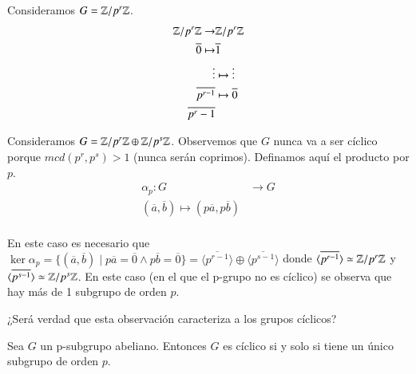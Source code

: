 \begin{ej}
	Consideramos $G = \mathbb{Z}/p^r\mathbb{Z}$.
	\begin{align*}
		\mathbb{Z}/p^r\mathbb{Z} \to &\mathbb{Z}/p^r\mathbb{Z} \\
		\overline{0} \mapsto & \overline{1} \\
		\vdots & \mapsto \vdots \\
		\overline{p^{r-1}} & \mapsto \overline{0} \\
		\overline{p^r-1} &
	\end{align*}
\end{ej}

\begin{ej}
	Consideramos $G = \mathbb{Z}/p^r\mathbb{Z} \oplus \mathbb{Z}/p^s\mathbb{Z}$. Observemos que $G$ nunca va a ser cíclico porque $mcd(p^r, p^s) > 1$ (nunca serán coprimos). Definamos aquí el producto por $p$.
	\begin{align*}
		\alpha_p : G &\to G \\
		(\overline{a}, \overline{b}) \mapsto (p\overline{a}, p \overline{b}) \\
	\end{align*}
	
	En este caso es necesario que $\ker \alpha_p = \{(\overline{a}, \overline{b}) \mid p\overline{a} = \overline{0} \land p \overline{b} = \overline{0}\} = \langle \overline{p^{r-1}}\rangle \oplus \langle \overline{p^{s-1}} \rangle$ donde $\langle \overline{p^{r-1}}\rangle \simeq \mathbb{Z}/p^r\mathbb{Z}$ y $\langle \overline{p^{s-1}}\rangle \simeq \mathbb{Z}/p^s\mathbb{Z}$. En este caso (en el que el p-grupo no es cíclico) se observa que hay más de 1 subgrupo de orden $p$.
\end{ej}

¿Será verdad que esta observación caracteriza a los grupos cíclicos?

\begin{thm}[de alguien 1]
	Sea $G$ un p-subgrupo abeliano. Entonces $G$ es cíclico si y solo si tiene un único subgrupo de orden $p$.
\end{thm}

